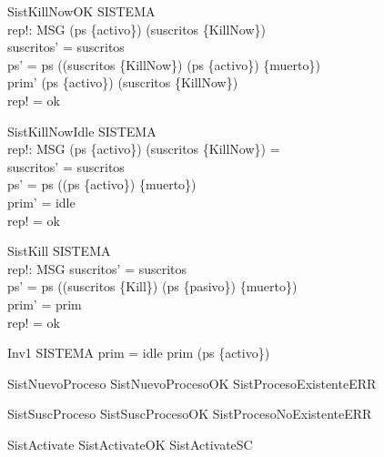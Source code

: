 \begin{schema}{SistKillNowOK}
  \Delta SISTEMA\\
  rep!: MSG
\where
  \dom  (ps \rres  \{activo\}) \setminus  \dom  (suscritos \rres  \{KillNow\}) \neq  \emptyset\\
  suscritos' = suscritos\\
  ps' = ps \oplus  (\dom  (suscritos \rres  \{KillNow\}) \cap  \dom  (ps \rres  \{activo\}) \cross  \{muerto\})\\
  prim' \in  \dom  (ps \rres  \{activo\}) \setminus  \dom  (suscritos \rres  \{KillNow\})\\
  rep! = ok
\end{schema}

\begin{schema}{SistKillNowIdle}
  \Delta SISTEMA\\
  rep!: MSG
\where
  \dom  (ps \rres  \{activo\}) \setminus  \dom  (suscritos \rres  \{KillNow\}) = \emptyset\\
  suscritos' = suscritos\\
  ps' = ps \oplus  (\dom  (ps \rres  \{activo\}) \cross  \{muerto\})\\
  prim' = idle\\
  rep! = ok
\end{schema}

\begin{schema}{SistKill}
  \Delta SISTEMA\\
  rep!: MSG
\where
  suscritos' = suscritos\\
  ps' = ps \oplus  (\dom  (suscritos \rres  \{Kill\}) \cap  \dom  (ps \rres  \{pasivo\}) \cross  \{muerto\})\\
  prim' = prim\\
  rep! = ok
\end{schema}

\begin{schema}{Inv1}
  SISTEMA
\where
  prim = idle \lor  prim \in  \dom  (ps \rres  \{activo\})
\end{schema}

\begin{zed}
SistNuevoProceso  SistNuevoProcesoOK \lor  SistProcesoExistenteERR
\end{zed}

\begin{zed}
SistSuscProceso  SistSuscProcesoOK \lor  SistProcesoNoExistenteERR
\end{zed}

\begin{zed}
SistActivate  SistActivateOK \lor  SistActivateSC
\end{zed}

